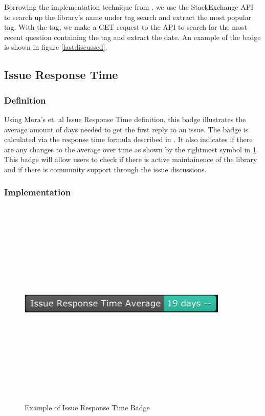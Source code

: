 \documentclass[12pt, letterpaper]{article}
\begin{document}
Borrowing the implementation technique from \cite{metrics}, we use the StackExchange API \cite{stackexchangeapi}
to search up the library's name under tag search and extract the most popular tag.
With the tag, we make a GET request to the API to search for the most recent question containing the tag
and extract the date. An example of the badge is shown in figure \ref{lastdiscussed}.

\subsection{Issue Response Time}
\subsubsection{Definition}
Using Mora's et. al \cite{metrics} Issue Response Time definition, this badge illustrates the average
amount of days needed to get the first reply to an issue. The badge is calculated via the response time
formula described in \cite{metrics}. It also indicates if there are any changes to the average over time 
as shown by the rightmost symbol in \ref{issueresponse}. 
This badge will allow users to check if there is active maintainence of the library and if there is community support
through the issue discussions. 

\subsubsection{Implementation}

\begin{figure}[!htb]
    \centerline{
        \includegraphics[width=10cm,height=10cm,keepaspectratio=true]{issueresponsebadge}
    }
    \caption{
        Example of Issue Response Time Badge
    }
    \label{issueresponse}
\end{figure}
\end{document}
